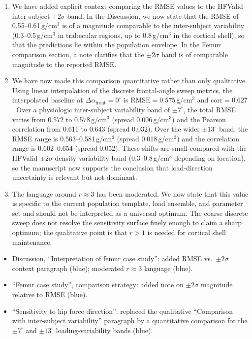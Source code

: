 \documentclass[11pt,a4paper]{article}
\newcommand{\change}{%
  \par\noindent{\color{blue}\textbf{Change in manuscript:}}\par\noindent\color{blue}%
}
\begin{document}
\begin{enumerate}[nosep]
\item We have added explicit context comparing the RMSE values to the HFValid inter-subject $\pm 2\sigma$ band. In the Discussion, we now state that the RMSE of 0.55--0.61\,g/cm$^{3}$ is of a magnitude comparable to the inter-subject variability (0.3--0.5\,g/cm$^{3}$ in trabecular regions, up to 0.8\,g/cm$^{3}$ in the cortical shell), so that the predictions lie within the population envelope. In the Femur comparison section, a note clarifies that the $\pm2\sigma$ band is of comparable magnitude to the reported RMSE.
\item We have now made this comparison quantitative rather than only qualitative. Using linear interpolation of the discrete frontal-angle sweep metrics, the interpolated baseline at $\Delta\alpha_{\mathrm{front}}=0^\circ$ is $\mathrm{RMSE}=0.575$\,g/cm$^{3}$ and $\mathrm{corr}=0.627$. Over a physiologic inter-subject variability band of $\pm 7^\circ$, the total RMSE varies from 0.572 to 0.578\,g/cm$^{3}$ (spread 0.006\,g/cm$^{3}$) and the Pearson correlation from 0.611 to 0.643 (spread 0.032). Over the wider $\pm 13^\circ$ band, the RMSE range is 0.563--0.581\,g/cm$^{3}$ (spread 0.018\,g/cm$^{3}$) and the correlation range is 0.602--0.654 (spread 0.052). These shifts are small compared with the HFValid $\pm2\sigma$ density variability band (0.3--0.8\,g/cm$^{3}$ depending on location), so the manuscript now supports the conclusion that load-direction uncertainty is relevant but not dominant.
\item The language around $r\approx 3$ has been moderated. We now state that this value is specific to the current population template, load ensemble, and parameter set and should not be interpreted as a universal optimum. The coarse discrete sweep does not resolve the sensitivity surface finely enough to claim a sharp optimum; the qualitative point is that $r>1$ is needed for cortical shell maintenance.
\end{enumerate}

\change
\begin{itemize}[nosep]
\item Discussion, ``Interpretation of femur case study'': added RMSE vs.\ $\pm2\sigma$ context paragraph (blue); moderated $r\approx 3$ language (blue).
\item ``Femur case study'', comparison strategy: added note on $\pm2\sigma$ magnitude relative to RMSE (blue).
\item ``Sensitivity to hip force direction'': replaced the qualitative ``Comparison with inter-subject variability'' paragraph by a quantitative comparison for the $\pm7^\circ$ and $\pm13^\circ$ loading-variability bands (blue).
\end{itemize}
\end{document}
